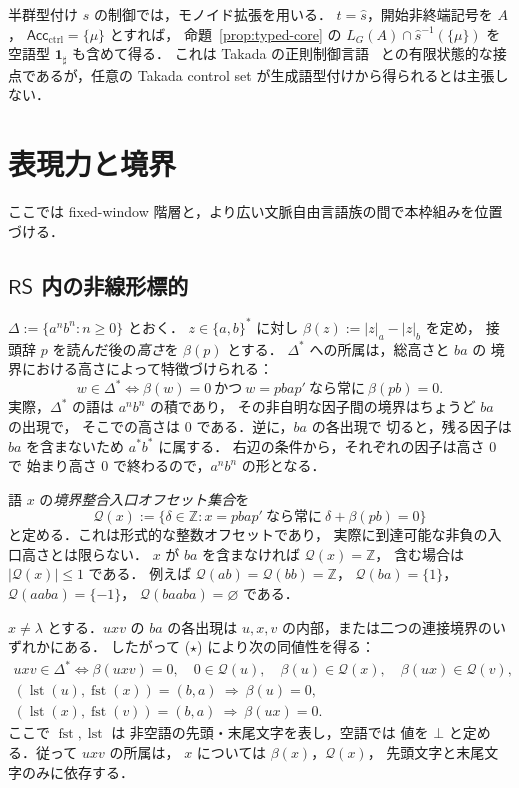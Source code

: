 \documentclass[11pt,a4paper]{ltjsarticle}
\theoremstyle{remark}
\theoremstyle{plain}
\begin{document}
半群型付け $s$ の制御では，モノイド拡張を用いる．
$t=\widehat s$，開始非終端記号を $A$，
$\mathsf{Acc}_{\mathrm{ctrl}}=\{\mu\}$ とすれば，
命題~\ref{prop:typed-core} の
$L_G(A)\cap \widehat s^{-1}(\{\mu\})$
を空語型 $\mathbf{1}_{\sharp}$ も含めて得る．
これは Takada の正則制御言語~\cite{takada1995}
との有限状態的な接点であるが，任意の
Takada control set が生成語型付けから得られるとは主張しない．

\section{表現力と境界}
\label{sec:boundaries}

ここでは fixed-window 階層と，より広い文脈自由言語族の間で本枠組みを位置づける．

\subsection{\texorpdfstring{$\mathsf{RS}$}{RS} 内の非線形標的}

$\Delta:=\{a^nb^n:n\ge0\}$ とおく．
$z\in\{a,b\}^*$ に対し
$\beta(z):=|z|_a-|z|_b$ を定め，
接頭辞 $p$ を読んだ後の\emph{高さ}を $\beta(p)$ とする．
$\Delta^*$ への所属は，総高さと $ba$ の
境界における高さによって特徴づけられる：
\begin{equation}\tag{$\star$}
w\in\Delta^*\iff \beta(w)=0\ \text{かつ}\
w=pba p'\ \text{なら常に}\ \beta(pb)=0.
\end{equation}
実際，$\Delta^*$ の語は $a^nb^n$ の積であり，
その非自明な因子間の境界はちょうど $ba$ の出現で，
そこでの高さは $0$ である．逆に，$ba$ の各出現で
切ると，残る因子は $ba$ を含まないため $a^*b^*$ に属する．
右辺の条件から，それぞれの因子は高さ $0$ で
始まり高さ $0$ で終わるので，$a^nb^n$ の形となる．

語 $x$ の\emph{境界整合入口オフセット集合}を
\[
\mathcal Q(x):=
\{\delta\in\mathbb Z:
 x=pba p'\ \text{なら常に}\ \delta+\beta(pb)=0\}
\]
と定める．これは形式的な整数オフセットであり，
実際に到達可能な非負の入口高さとは限らない．
$x$ が $ba$ を含まなければ
$\mathcal Q(x)=\mathbb Z$，
含む場合は $|\mathcal Q(x)|\le1$ である．
例えば
$\mathcal Q(ab)=\mathcal Q(bb)=\mathbb Z$，
$\mathcal Q(ba)=\{1\}$，
$\mathcal Q(aaba)=\{-1\}$，
$\mathcal Q(baaba)=\varnothing$ である．

$x\ne\lambda$ とする．$uxv$ の $ba$ の各出現は
$u,x,v$ の内部，または二つの連接境界のいずれかにある．
したがって \textup{($\star$)} により次の同値性を得る：
\begin{equation}\tag{$\star\star$}
\begin{gathered}
uxv\in\Delta^*
\iff \beta(uxv)=0,\quad
0\in\mathcal Q(u),\quad
\beta(u)\in\mathcal Q(x),\quad
\beta(ux)\in\mathcal Q(v),\\
(\operatorname{lst}(u),\operatorname{fst}(x))=(b,a)
\ \Longrightarrow\ \beta(u)=0,\\
(\operatorname{lst}(x),\operatorname{fst}(v))=(b,a)
\ \Longrightarrow\ \beta(ux)=0.
\end{gathered}
\end{equation}
ここで $\operatorname{fst},\operatorname{lst}$ は
非空語の先頭・末尾文字を表し，空語では
値を $\bot$ と定める．従って $uxv$ の所属は，
$x$ については $\beta(x)$，$\mathcal Q(x)$，
先頭文字と末尾文字のみに依存する．
\end{document}
